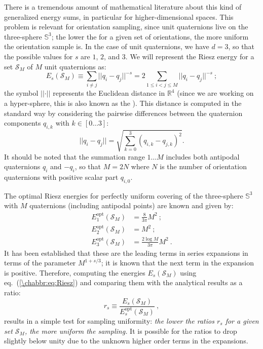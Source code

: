 There is a tremendous amount of mathematical literature about this kind of generalized energy sums, in particular for higher-dimensional spaces.  This problem is relevant for orientation sampling, since unit quaternions live on the three-sphere $\mathbb{S}^3$; the lower the  for a given set of orientations, the more uniform the orientation sample is.  In  the case of unit quaternions, we have $d=3$, so that the possible values for $s$ are $1$, $2$, and $3$.  We will represent the Riesz energy for a set $\mathcal{S}_M$ of $M$ unit quaternions as:
\begin{equation}
	E_s(\mathcal{S}_M)\equiv \sum_{i\ne j} \vert\vert q_i-q_j\vert\vert^{-s}=2\sum_{1\le i< j\le M} \vert\vert q_i-q_j\vert\vert^{-s}\ ; \label{\chabbr:eq:Riesz}
\end{equation}
the symbol $\vert\vert\cdot\vert\vert$ represents the Euclidean distance in $\mathbb{R}^4$ (since we are working on a hyper-sphere, this is also known as the ). This distance is computed in the standard way by considering the pairwise differences between the quaternion components $q_{i,k}$ with $k\in[0\ldots 3]$:
\[
	\vert\vert q_i-q_j\vert\vert = \sqrt{\sum_{k=0}^{3}(q_{i,k}-q_{j,k})^2}.
\]
It should be noted that the summation range $1\ldots M$ includes both antipodal quaternions $q_i$ and $-q_i$, so that $M=2N$ where $N$ is the number of orientation quaternions with positive scalar part $q_{i,0}$.  

The optimal Riesz energies for perfectly uniform covering of the three-sphere $\mathbb{S}^3$ with $M$ quaternions (including antipodal points) are known and given by:
\begin{equation}
\begin{split}
	E_1^{\text{opt}}(\mathcal{S}_M) &= \frac{8}{3\pi}M^2\ ; \\
	E_2^{\text{opt}}(\mathcal{S}_M) &= M^2\ ; \\
	E_3^{\text{opt}}(\mathcal{S}_M) &= \frac{2\log M}{3\pi}M^2\ .
\end{split}
\end{equation}
It has been established \cite{hardin2005a} that these are the leading terms in series expansions in terms of the parameter $M^{1+s/3}$;  it is known that the next term in the expansion is positive.  Therefore, computing the energies $E_s(\mathcal{S}_M)$ using eq.~(\ref{\chabbr:eq:Riesz}) and comparing them with the analytical results as a ratio:
\[
	r_s \equiv \frac{E_s(\mathcal{S}_M)}{E_s^{\text{opt}}(\mathcal{S}_M)}\ ,
\]
results in a simple test for sampling uniformity: \textit{the lower the ratios $r_s$ for a given set $\mathcal{S}_M$, the more uniform the sampling.} It is possible for the ratios to drop slightly below unity due to the unknown higher order terms in the expansions.

